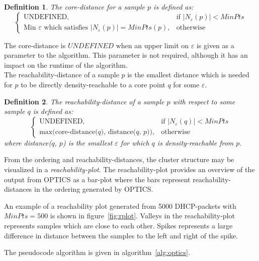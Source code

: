 \documentclass[a4paper]{report}
\newtheorem*{definition}{Definition}
\begin{document}
\begin{definition}
    The core-distance for a sample $p$ is defined as:
\[
    \begin{cases}
        \text{UNDEFINED}, & \text{if $|N_{\varepsilon}(p)| < MinPts$}\\
        \text{Min $\varepsilon$ which satisfies  $|N_{\varepsilon}(p)| =
        MinPts$}(p), & \text{otherwise}
    \end{cases}
\]
\end{definition}

The core-distance is $UNDEFINED$ when an upper limit on $\varepsilon$ is
given as a parameter to the algorithm. This parameter is not required,
although it has an impact on the runtime of the algorithm.
\\[0.5cm]
The reachability-distance of a sample $p$ is the smallest distance which is
needed for $p$ to be directly density-reachable to a core point $q$ for some
$\varepsilon$. 

\begin{definition}
    The reachability-distance of a sample $p$ with respect to some sample $q$
    is defined as:
\[
    \begin{cases}
        \text{UNDEFINED}, & \text{if $|N_{\varepsilon}(q)| < MinPts$}\\
        \text{max(core-distance($q$), distance($q$, $p$))}, & \text{otherwise}
    \end{cases}
\]
    where distance($q$, $p$) is the smallest $\varepsilon$ for which $q$ is
    density-reachable from $p$.
\end{definition}

From the ordering and reachability-distances, the cluster structure may be
visualized in a \emph{reachability-plot}. The reachability-plot provides an
overview of the output from OPTICS as a bar-plot where the bars represent
reachability-distances in the ordering generated by OPTICS.

An example of a reachability plot generated from 5000 DHCP-packets with 
$MinPts = 500$ is shown in figure~\ref{fig:rplot}. Valleys in the
reachability-plot represents samples which are close to each other. Spikes
represents a large difference in distance between the samples to the left and
right of the spike.

The pseudocode algorithm is given in algorithm~\ref{alg:optics}.
\end{document}

